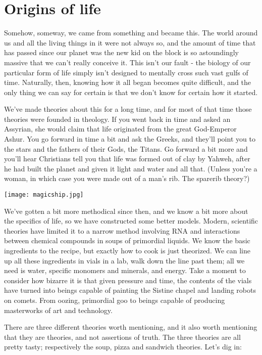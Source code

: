 \section{Origins of life}

Somehow, someway, we came from something and became this. The world around us and all the living things in it were not always so, and the amount of time that has passed since our planet was the new kid on the block is so astoundingly massive that we can’t really conceive it. This isn’t our fault - the biology of our particular form of life simply isn’t designed to mentally cross such vast gulfs of time. Naturally, then, knowing how it all began becomes quite difficult, and the only thing we can say for certain is that we don’t know for certain how it started.

We’ve made theories about this for a long time, and for most of that time those theories were founded in theology. If you went back in time and asked an Assyrian, she would claim that life originated from the great God-Emperor Ashur. You go forward in time a bit and ask the Greeks, and they’ll point you to the stars and the fathers of their Gods, the Titans. Go forward a bit more and you’ll hear Christians tell you that life was formed out of clay by Yahweh, after he had built the planet and given it light and water and all that. (Unless you’re a woman, in which case you were made out of a man’s rib. The sparerib theory?) 

\begin{center}
	\texttt{[image: magicship.jpg]}
\end{center}

We’ve gotten a bit more methodical since then, and we know a bit more about the specifics of life, so we have constructed some better models. Modern, scientific theories have limited it to a narrow method involving RNA and interactions between chemical compounds in soups of primordial liquids. We know the basic ingredients to the recipe, but exactly how to cook is just theorized. We can line up all these ingredients in vials in a lab, walk down the line past them; all we need is water, specific monomers and minerals, and energy. Take a moment to consider how bizarre it is that given pressure and time, the contents of the vials have turned into beings capable of painting the Sistine chapel and landing robots on comets. From oozing, primordial goo to beings capable of producing masterworks of art and technology.

There are three different theories worth mentioning, and it also worth mentioning that they are theories, and not assertions of truth. The three theories are all pretty tasty; respectively the soup, pizza and sandwich theories. Let’s dig in:

